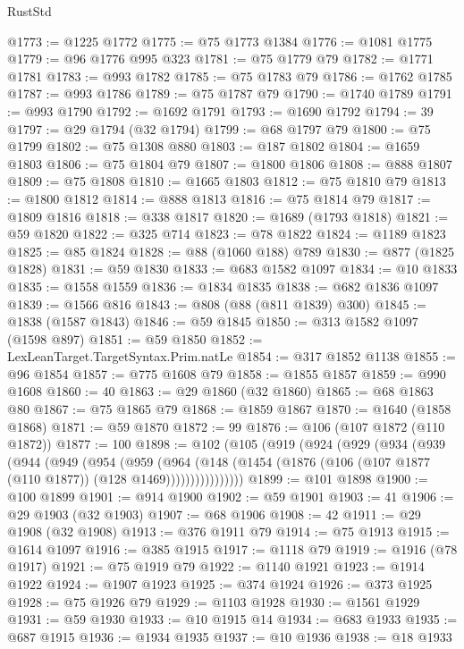 \begin{lexlean}{RustStd}
\begin{coremodule}
@1773 := @1225 @1772
@1775 := @75 @1773 @1384
@1776 := @1081 @1775
@1779 := @96 @1776 @995 @323
@1781 := @75 @1779 @79
@1782 := @1771 @1781
@1783 := @993 @1782
@1785 := @75 @1783 @79
@1786 := @1762 @1785
@1787 := @993 @1786
@1789 := @75 @1787 @79
@1790 := @1740 @1789
@1791 := @993 @1790
@1792 := @1692 @1791
@1793 := @1690 @1792
@1794 := 39
@1797 := @29 @1794 (@32 @1794)
@1799 := @68 @1797 @79
@1800 := @75 @1799
@1802 := @75 @1308 @880
@1803 := @187 @1802
@1804 := @1659 @1803
@1806 := @75 @1804 @79
@1807 := @1800 @1806
@1808 := @888 @1807
@1809 := @75 @1808
@1810 := @1665 @1803
@1812 := @75 @1810 @79
@1813 := @1800 @1812
@1814 := @888 @1813
@1816 := @75 @1814 @79
@1817 := @1809 @1816
@1818 := @338 @1817
@1820 := @1689 (@1793 @1818)
@1821 := @59 @1820
@1822 := @325 @714
@1823 := @78 @1822
@1824 := @1189 @1823
@1825 := @85 @1824
@1828 := @88 (@1060 @188) @789
@1830 := @877 (@1825 @1828)
@1831 := @59 @1830
@1833 := @683 @1582 @1097
@1834 := @10 @1833
@1835 := @1558 @1559
@1836 := @1834 @1835
@1838 := @682 @1836 @1097
@1839 := @1566 @816
@1843 := @808 (@88 (@811 @1839) @300)
@1845 := @1838 (@1587 @1843)
@1846 := @59 @1845
@1850 := @313 @1582 @1097 (@1598 @897)
@1851 := @59 @1850
@1852 := LexLeanTarget.TargetSyntax.Prim.natLe
@1854 := @317 @1852 @1138
@1855 := @96 @1854
@1857 := @775 @1608 @79
@1858 := @1855 @1857
@1859 := @990 @1608
@1860 := 40
@1863 := @29 @1860 (@32 @1860)
@1865 := @68 @1863 @80
@1867 := @75 @1865 @79
@1868 := @1859 @1867
@1870 := @1640 (@1858 @1868)
@1871 := @59 @1870
@1872 := 99
@1876 := @106 (@107 @1872 (@110 @1872))
@1877 := 100
@1898 := @102
    (@105
      (@919
        (@924
          (@929
            (@934
              (@939
                (@944
                  (@949
                    (@954
                      (@959
                        (@964
                          (@148
                            (@1454
                              (@1876 (@106 (@107 @1877 (@110 @1877)) (@128 @1469))))))))))))))))
@1899 := @101 @1898
@1900 := @100 @1899
@1901 := @914 @1900
@1902 := @59 @1901
@1903 := 41
@1906 := @29 @1903 (@32 @1903)
@1907 := @68 @1906
@1908 := 42
@1911 := @29 @1908 (@32 @1908)
@1913 := @376 @1911 @79
@1914 := @75 @1913
@1915 := @1614 @1097
@1916 := @385 @1915
@1917 := @1118 @79
@1919 := @1916 (@78 @1917)
@1921 := @75 @1919 @79
@1922 := @1140 @1921
@1923 := @1914 @1922
@1924 := @1907 @1923
@1925 := @374 @1924
@1926 := @373 @1925
@1928 := @75 @1926 @79
@1929 := @1103 @1928
@1930 := @1561 @1929
@1931 := @59 @1930
@1933 := @10 @1915 @14
@1934 := @683 @1933
@1935 := @687 @1915
@1936 := @1934 @1935
@1937 := @10 @1936
@1938 := @18 @1933

\end{coremodule}
\end{lexlean}
